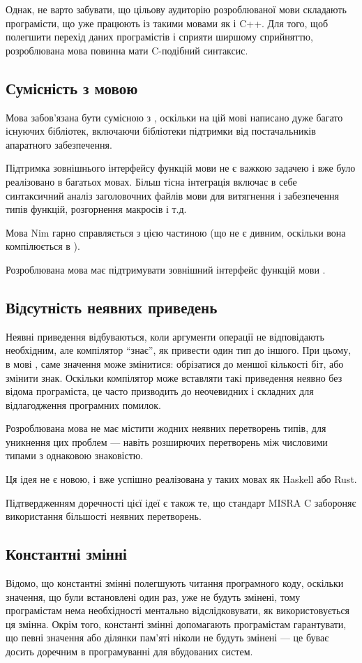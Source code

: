 \documentclass[main.tex]{subfiles}
\begin{document}
Однак, не варто забувати, що цільову аудиторію розроблюваної мови складають програмісти, що уже працюють із такими мовами як \LangC{} і C++. Для того, щоб полегшити перехід даних програмістів і сприяти ширшому сприйняттю, розроблювана мова повинна мати C-подібний синтаксис.

\subsection{Сумісність з мовою \LangC{}}
Мова забов'язана бути сумісною з \LangC{}, оскільки на цій мові написано дуже багато існуючих бібліотек, включаючи бібліотеки підтримки від постачальників апаратного забезпечення.

Підтримка зовнішнього інтерфейсу функцій мови \LangC{} не є важкою задачею і вже було реалізовано в багатьох мовах.
Більш тісна інтеграція включає в себе синтаксичний аналіз заголовочних файлів мови \LangC{} для витягнення і забезпечення типів функцій, розгорнення макросів і т.д.

Мова Nim гарно справляється з цією частиною (що не є дивним, оскільки вона компілюється в \LangC{}).

Розроблювана мова має підтримувати зовнішний інтерфейс функцій мови \LangC{}.

\subsection{Відсутність неявних приведень}
Неявні приведення відбуваються, коли аргументи операції не відповідають необхідним, але компілятор ``знає'', як привести один тип до іншого. При цьому, в мові \LangC{}, саме значення може змінитися: обрізатися до меншої кількості біт, або змінити знак. Оскільки компілятор може вставляти такі приведення неявно без відома програміста, це часто призводить до неочевидних і складних для відлагодження програмних помилок.

Розроблювана мова не має містити жодних неявних перетворень типів, для уникнення цих проблем --- навіть розширючих перетворень між числовими типами з однаковою знаковістю.

Ця ідея не є новою, і вже успішно реалізована у таких мовах як Haskell або Rust.

Підтвердженням доречності цієї ідеї є також те, що стандарт MISRA C забороняє використання більшості неявних перетворень.

\subsection{Константні змінні}
Відомо, що константні змінні полегшують читання програмного коду, оскільки значення, що були встановлені один раз, уже не будуть змінені, тому програмістам нема необхідності ментально відслідковувати, як використовується ця змінна. Окрім того, константі змінні допомагають програмістам гарантувати, що певні значення або ділянки пам'яті ніколи не будуть змінені --- це буває досить доречним в програмуванні для вбудованих систем.
\end{document}
